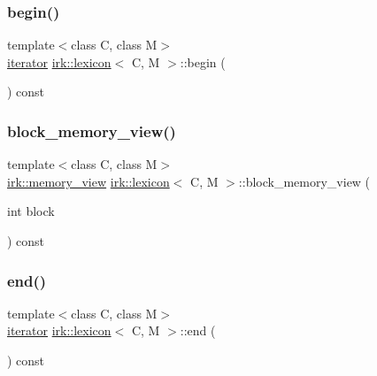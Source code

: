 \subsubsection{\texorpdfstring{begin()}{begin()}}
{\footnotesize\ttfamily template$<$class C, class M$>$ \\
\mbox{\hyperlink{classirk_1_1lexicon_1_1iterator}{iterator}} \mbox{\hyperlink{classirk_1_1lexicon}{irk\+::lexicon}}$<$ C, M $>$\+::begin (\begin{DoxyParamCaption}{ }\end{DoxyParamCaption}) const\hspace{0.3cm}{\ttfamily [inline]}}

\mbox{\label{classirk_1_1lexicon_a1eacbab9f09dd3514f6940fdddcae250}} 
\subsubsection{\texorpdfstring{block\+\_\+memory\+\_\+view()}{block\_memory\_view()}}
{\footnotesize\ttfamily template$<$class C, class M$>$ \\
\mbox{\hyperlink{classirk_1_1memory__view}{irk\+::memory\+\_\+view}} \mbox{\hyperlink{classirk_1_1lexicon}{irk\+::lexicon}}$<$ C, M $>$\+::block\+\_\+memory\+\_\+view (\begin{DoxyParamCaption}\item[{int}]{block }\end{DoxyParamCaption}) const\hspace{0.3cm}{\ttfamily [inline]}}

\mbox{\label{classirk_1_1lexicon_a6dd97dfda5dbcafa53626596e8666529}} 
\subsubsection{\texorpdfstring{end()}{end()}}
{\footnotesize\ttfamily template$<$class C, class M$>$ \\
\mbox{\hyperlink{classirk_1_1lexicon_1_1iterator}{iterator}} \mbox{\hyperlink{classirk_1_1lexicon}{irk\+::lexicon}}$<$ C, M $>$\+::end (\begin{DoxyParamCaption}{ }\end{DoxyParamCaption}) const\hspace{0.3cm}{\ttfamily [inline]}}

